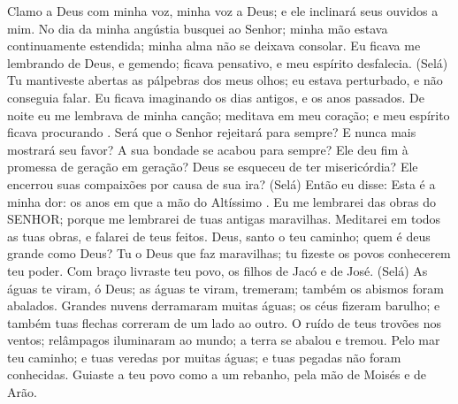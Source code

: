 {\PP 
  Clamo a Deus com minha voz, minha voz a Deus; e ele inclinará seus ouvidos a mim.
  No dia da minha angústia busquei ao Senhor; minha mão estava continuamente estendida; minha alma não se deixava consolar.
  Eu ficava me lembrando de Deus, e gemendo; ficava pensativo, e meu espírito desfalecia. (Selá)
  Tu mantiveste abertas as pálpebras dos meus olhos; eu estava perturbado, e não conseguia falar.
  Eu ficava imaginando os dias antigos, e os anos passados.
  De noite eu me lembrava de minha canção; meditava em meu coração; e meu espírito ficava procurando
{} .
  Será que o Senhor rejeitará para sempre? E nunca mais mostrará seu favor?
  A sua bondade se acabou para sempre? Ele deu fim à
{} promessa de geração em geração?
  Deus se esqueceu de ter misericórdia? Ele encerrou suas compaixões por causa de sua ira? (Selá)
  Então eu disse: Esta é a minha dor: os anos em que a mão do Altíssimo
{} .
  Eu me lembrarei das obras do SENHOR; porque me lembrarei de tuas antigas maravilhas.
  Meditarei em todos as tuas obras, e falarei de teus feitos.
  Deus, santo
{} o teu caminho; quem é deus
{} grande como
{} Deus?
  Tu
{} o Deus que faz maravilhas; tu fizeste os povos conhecerem teu poder.
  Com
{} braço livraste teu povo, os filhos de Jacó e de José. (Selá)
  As águas te viram, ó Deus; as águas te viram,
{} tremeram; também os abismos foram abalados.
  Grandes nuvens derramaram muitas águas; os céus fizeram barulho; e também tuas flechas correram de um lado ao outro.
  O ruído de teus trovões
{} nos ventos; relâmpagos iluminaram ao mundo; a terra se abalou e tremou.
  Pelo mar
{} teu caminho; e tuas veredas por muitas águas; e tuas pegadas não foram conhecidas.
  Guiaste a teu povo como a um rebanho, pela mão de Moisés e de Arão.
\par }


